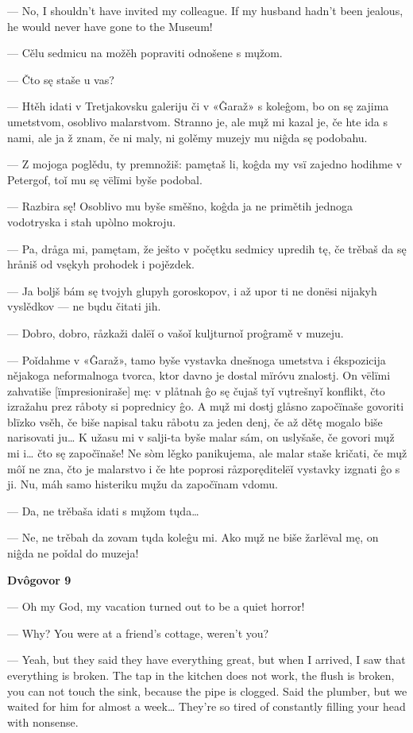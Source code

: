 — No, I shouldn’t have invited my colleague. If my husband hadn’t been jealous, he would never have gone to the Museum!


— Cělu sedmicu na možěh popraviti odnošene s mųžom.

— Čto sę staše u vas?

— Htěh idati v Tretjakovsku galeriju či v «Ĝaraž» s koleĝom, bo on sę zajima umetstvom, osoblivo malarstvom. Stranno je, ale mųž mi kazal je, če hte ida s nami, ale ja ž znam, če ni maly, ni golěmy muzejy mu niĝda sę podobahu.

— Z mojoga poglědu, ty premnožiš: pamętaš li, koĝda my vsï zajedno hodihme v Petergof, toǐ mu sę vëlïmi byše podobal.

— Razbira sę! Osoblivo mu byše směšno, koĝda ja ne primětih jednoga vodotryska i stah upòlno mokroju.

— Pa, dråga mi, pamętam, že ješto v počętku sedmicy upredih tę, če trěbaš da sę hråniš od vsękyh prohodek i pojězdek.

— Ja boljš bám sę tvojyh glupyh goroskopov, i až upor ti ne donësi nijakyh vyslědkov — ne bųdu čitati jih.

— Dobro, dobro, råzkaži dalëǐ o vašoǐ kuljturnoǐ proĝramě v muzeju.

— Poǐdahme v «Ĝaraž», tamo byše vystavka dnešnoga umetstva i ékspozicija nějakoga neformalnoga tvorca, ktor davno je dostal mïróvu znalostj. On vëlïmi zahvatiše [ïmpresioniraše] mę: v plåtnah ĝo sę čujaš tyǐ vųtrešnyǐ konflikt, čto izražahu prez råboty si poprednicy ĝo. A mųž mi dostj glåsno započïnaše govoriti blïzko vsěh, če biše napisal taku råbotu za jeden denj, če až dětę mogalo biše narisovati ju… K užasu mi v salji-ta byše malar sám, on uslyšaše, če govori mųž mi i… čto sę započïnaše! Ne sòm lěgko panikujema, ale malar staše kričati, če mųž môǐ ne zna, čto je malarstvo i če hte poprosi råzporęditelëǐ vystavky izgnati ĝo s ji. Nu, máh samo histeriku mųžu da započïnam vdomu.

— Da, ne trěbaša idati s mųžom tųda…

— Ne, ne trěbah da zovam tųda koleĝu mi. Ako mųž ne biše žarlëval mę, on niĝda ne poǐdal do muzeja!


\textbf{Dvôgovor 9}


— Oh my God, my vacation turned out to be a quiet horror!

— Why? You were at a friend’s cottage, weren’t you?

— Yeah, but they said they have everything great, but when I arrived, I saw that everything is broken. The tap in the kitchen does not work, the flush is broken, you can not touch the sink, because the pipe is clogged. Said the plumber, but we waited for him for almost a week… They’re so tired of constantly filling your head with nonsense.

